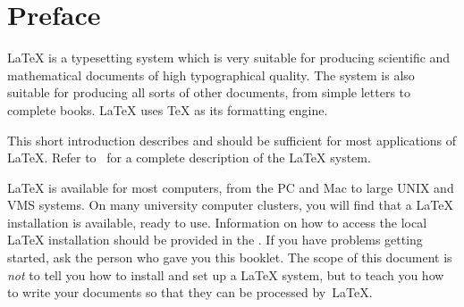 ﻿%
\chapter{Preface}

\LaTeX{} \cite{manual} is a typesetting system which is very 
suitable for producing scientific and mathematical documents of high
typographical quality. The system is also suitable for producing all
sorts of other documents, from simple letters to complete books.
\LaTeX{} uses \TeX{} \cite{texbook} as its formatting engine.

This short introduction describes \LaTeXe{} and should be sufficient
for most applications of \LaTeX. Refer to~\cite{manual,companion} for
a complete description of the \LaTeX{} system.

\LaTeX{} is available for most computers, from the PC and Mac to large
UNIX and VMS systems. On many university computer clusters, you will
find that a \LaTeX{} installation is available, ready to use.
Information on how to access
the local \LaTeX{} installation should be provided in the \guide. If
you have problems getting started, ask the person who gave you this
booklet. The scope of this document is \emph{not} to tell you how to
install and set up a \LaTeX{} system, but to teach you how to write
your documents so that they can be processed by~\LaTeX{}.


